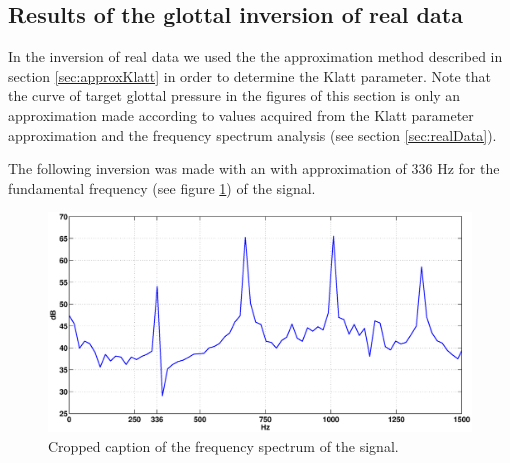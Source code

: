 \documentclass[12pt,a4]{article}
\begin{document}
\subsection{Results of the glottal inversion of real data}
\label{sec:realResults}
In the inversion of real data we used the the approximation method described in section \ref{sec:approxKlatt} in order to determine the Klatt parameter. Note that the curve of target glottal pressure in the figures of this section is only an approximation made according to values acquired from the Klatt parameter approximation and the frequency spectrum analysis (see section \ref{sec:realData}).

The following inversion was made with an with approximation of 336 Hz for the fundamental frequency (see figure \ref{fig:roopeHigh}) of the signal.
\begin{figure}[H]
\begin{center}
 \includegraphics[scale=.3]{img/roope_high_spectrum.eps}
 \caption{Cropped caption of the frequency spectrum of the signal.}\label{fig:roopeHigh}
\end{center}
\end{figure}
\end{document}

